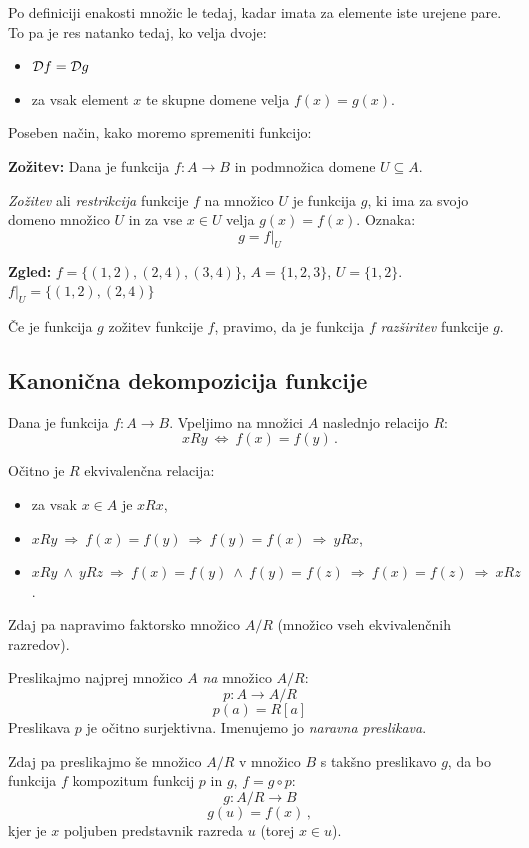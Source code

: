 \documentclass[11pt,paper=b5,DIV=13,headinclude,footinclude]{scrbook}
\def\inn {{~\wedge~}}
\def\sledi {{~\Rightarrow~}}
\def\cee {{~\Leftrightarrow~}}
\begin{document}
Po definiciji enakosti množic le tedaj, kadar imata za elemente iste urejene pare. To pa je res natanko tedaj, ko velja dvoje:
\begin{itemize}
  \item ${\cal D}f = {\cal D}g$
  \item za vsak element $x$ te skupne domene velja $f(x) = g(x)$.
\end{itemize}

Poseben način, kako moremo spremeniti funkcijo:

\medskip
\textbf{ Zožitev:}
Dana je funkcija $f:A\to B$ in podmnožica domene $U\subseteq A$.

{\em Zožitev} ali {\em restrikcija} funkcije $f$ na množico $U$
je funkcija $g$, ki ima za svojo domeno množico $U$ in za vse $x\in U$ velja
$g(x) = f(x)$. Oznaka:
$$g = f|_{U}$$

\bigskip
\textbf{ Zgled:} $f = \{(1,2),(2,4),(3,4)\}$, $A = \{1,2,3\}$, $U =  \{1,2\}$.
$f|_U = \{(1,2),(2,4)\}$

\bigskip
Če je funkcija $g$ zožitev funkcije $f$, pravimo, da je funkcija $f$ {\em razširitev} funkcije $g$.

\subsection{Kanonična dekompozicija funkcije}

Dana je funkcija $f:A{\to} B$.
Vpeljimo na množici $A$ naslednjo relacijo $R$:
$$xRy \cee f(x) = f(y)\,.$$

Očitno je $R$ ekvivalenčna relacija:
\begin{itemize}
  \item za vsak $x\in A$ je $xRx$,
  \item $xRy \sledi f(x) = f(y) \sledi f(y) = f(x) \sledi yRx$,
  \item $xRy \inn yRz \sledi f(x) = f(y) \inn f(y) = f(z) \sledi f(x) = f(z) \sledi xRz$.
\end{itemize}
Zdaj pa napravimo faktorsko množico $A/R$ (množico vseh ekvivalenčnih razredov).

Preslikajmo najprej množico $A$ {\em na} množico  $A/R$:
$$p:A{\to} A/R$$
$$p(a) = R[a]$$
Preslikava $p$ je očitno surjektivna. Imenujemo jo {\em naravna preslikava}.

Zdaj pa preslikajmo še množico $A/R$ v množico $B$ s takšno preslikavo $g$, da bo
funkcija $f$ kompozitum funkcij $p$ in $g$, $f = g\circ p$:
$$g:A/R{\to} B$$
$$g(u) = f(x)\,,$$
kjer je $x$ poljuben predstavnik razreda $u$ (torej $x\in u$).
\end{document}
